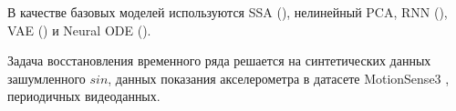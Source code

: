 \documentclass{article}
\begin{document}
В качестве базовых моделей используются SSA (\citep{golyandina2001analysis}), нелинейный PCA, RNN (\citep{bronstein2021geometric}), VAE (\citep{kingma2019introduction}) и Neural ODE (\citep{chen2018neural}).

Задача восстановления временного ряда решается на синтетических данных зашумленного $sin$, данных показания акселерометра в датасете MotionSense3 \citep{malekzadeh2018protecting}, периодичных видеоданных. 


\newpage


\end{document}
